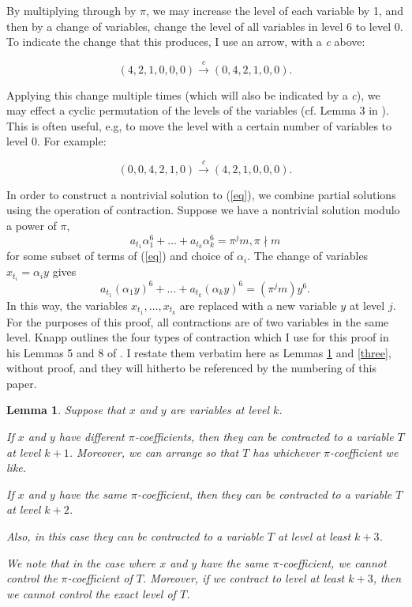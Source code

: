 \documentclass{article}
\newtheorem{lemma}{Lemma}
\begin{document}
By multiplying through by $\pi$, we may increase the level of each variable by 1, and then by a change of variables, change the level of all variables in level 6 to level 0.  To indicate the change that this produces, I use an arrow, with a \textit{c} above:

$$ (4,2,1,0,0,0) \xrightarrow{c} (0,4,2,1,0,0).$$

Applying this change multiple times (which will also be indicated by a  \textit{c}), we may effect a cyclic permutation of the levels of the variables (cf. Lemma 3 in \cite{knapp2016solubility}).  This is often useful, e.g, to move the level with a certain number of variables to level 0.  For example:

$$ (0,0,4,2,1,0) \xrightarrow{c} (4,2,1,0,0,0).$$

In order to construct a nontrivial solution to (\ref{eq}), we combine partial solutions using the operation of contraction.  Suppose we have a nontrivial solution modulo a power of $\pi$,  $$a_{t_1}\alpha_1^6 + \ldots + a_{t_k}\alpha_k^6 = \pi^j m, \pi \nmid m$$ for some subset of terms of (\ref{eq}) and choice of $\alpha_i$.  The change of variables $x_{t_i} = \alpha_i y$ gives $$a_{t_1}(\alpha_1 y)^6 + \ldots + a_{t_k}(\alpha_k y)^6 = (\pi^j m )y^6.$$  In this way, the variables $x_{t_1}, \ldots, x_{t_k}$ are replaced with a new variable $y$ at level $j.$  For the purposes of this proof, all contractions are of two variables in the same level.  Knapp outlines the four types of contraction which I use for this proof in his Lemmas 5 and 8 of \cite{knapp2016solubility}. I restate them verbatim here as Lemmas \ref{two} and \ref{three}, without proof, and they will hitherto be referenced by the numbering of this paper.

\begin{lemma}
\label{two}
Suppose that $x$ and $y$ are variables at level $k$.

If $x$ and $y$ have different $\pi$-coefficients, then they can be contracted to a variable $T$ at level $k + 1$. Moreover, we can arrange so that $T$ has whichever $\pi$-coefficient we like.

If $x$ and $y$ have the same $\pi$-coefficient, then they can be contracted to a variable $T$ at level $k + 2$.

Also, in this case they can be contracted to a variable $T$ at level at least $k + 3$.
  
We note that in the case where $x$ and $y$ have the same $\pi$-coefficient, we cannot control the $\pi$-coefficient of $T$. Moreover, if we contract to level at least $k + 3$, then we cannot control the exact level of $T$.
\end{lemma}
\end{document}
